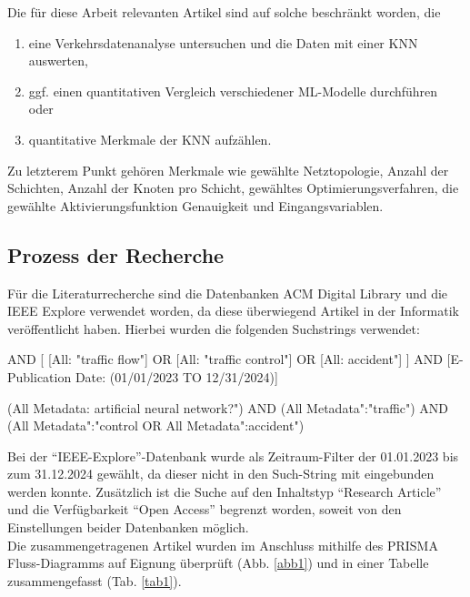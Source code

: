 \documentclass{scrartcl}
\begin{document}
Die für diese Arbeit relevanten Artikel sind auf solche beschränkt worden, die
\begin{enumerate}
   \item{eine Verkehrsdatenanalyse untersuchen und die Daten mit einer KNN auswerten,}
   \item{ggf. einen quantitativen Vergleich verschiedener ML-Modelle durchführen oder}
   \item{quantitative Merkmale der KNN aufzählen.}
\end{enumerate}
Zu letzterem Punkt gehören Merkmale wie gewählte Netztopologie, Anzahl der Schichten,
Anzahl der Knoten pro Schicht, gewähltes Optimierungsverfahren, die gewählte
Aktivierungsfunktion Genauigkeit und Eingangsvariablen.

\subsection{Prozess der Recherche}

Für die Literaturrecherche sind die Datenbanken ACM Digital Library und die
IEEE Explore verwendet worden, da diese überwiegend Artikel in der Informatik
veröffentlicht haben.
Hierbei wurden die folgenden Suchstrings verwendet:

\begin{tcolorbox}
   AND [
         [All: "traffic flow"]
         OR [All: "traffic control"]
         OR [All: \dq accident"]
      ]
   AND [E-Publication Date: (01/01/2023 TO 12/31/2024)]
\end{tcolorbox}

\begin{tcolorbox}[
      enhanced,
      attach boxed title to top left,
      colback=gray!20,
      colframe=gray,
      colbacktitle=gray,
      title=IEEE Explore,
      fonttitle=\bfseries\color{black},
      boxed title style={size=small, colframe=gray, sharp corners},
      sharp corners
   ]
   (\dq All Metadata\dq: \dq artificial neural network?")
   AND (\dq All Metadata":"traffic")
   AND (\dq All Metadata":"control\dq\space
   OR \dq All Metadata":\dq accident")
\end{tcolorbox}

Bei der \enquote{IEEE-Explore}-Datenbank wurde als Zeitraum-Filter der 01.01.2023
bis zum 31.12.2024 gewählt, da dieser nicht in den Such-String mit eingebunden
werden konnte.  Zusätzlich ist die Suche auf den Inhaltstyp
\enquote{Research Article} und die Verfügbarkeit \enquote{Open Access}
begrenzt worden, soweit von den Einstellungen beider Datenbanken möglich.
\medskip \\
Die zusammengetragenen Artikel wurden im Anschluss mithilfe des PRISMA
Fluss-Diagramms \cite{prisma} auf Eignung überprüft (Abb. \ref{abb1}) und in einer Tabelle
zusammengefasst (Tab. \ref{tab1}).
\end{document}
